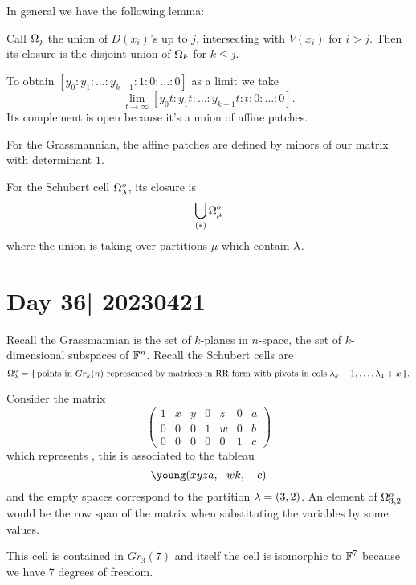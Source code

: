 \documentclass[12pt]{memoir}
\begin{document}
In general we have the following lemma:

\begin{Lem}
    Call $\Omega_j$ the union of $D(x_i)$'s up to $j$, intersecting with $V(x_i)$ for $i>j$. Then its closure is the disjoint union of $\Omega_k$ for $k\leq j$.
\end{Lem}

\begin{ptcbp}
    To obtain $[y_0:y_1:\dots:y_{k-1}:1:0:\dots:0]$ as a limit we take 
    $$\lim_{t\to\infty}[y_0t:y_1t:\dots:y_{k-1}t:t:0:\dots:0].$$
    Its complement is open because it's a union of affine patches.
\end{ptcbp}

For the Grassmannian, the affine patches are defined by minors of our matrix with determinant $1$.

\begin{Th}
    For the Schubert cell $\Omega_\lambda^o$, its closure is 
    $$\bigcup_{(\ast)}\Omega_\mu^o$$
    where the union is taking over partitions $\mu$ which contain $\lambda$.
\end{Th}

\section{Day 36| 20230421}

Recall the Grassmannian is the set of $k$-planes in $n$-space, the set of $k$-dimensional subspaces of $\mathbb{F}^n$. Recall the Schubert cells are 
$$\Omega_\lambda^o=\{\,\text{points in }Gr_k(n)\text{ represented by matrices in RR form with pivots in cols.}\lambda_k+1,\dots,\lambda_1+k\,\}.$$
\begin{Ex}
    Consider the matrix 
    $$\begin{pmatrix}
        1&x&y&0&z&0&a\\
        0&0&0&1&w&0&b\\
        0&0&0&0&0&1&c
    \end{pmatrix}$$
    which represents , this is associated to the tableau 
    $$\young(xyza,~~wk,~~~c)$$
    and the empty spaces correspond to the partition $\lambda=(3,2)$. An element of $\Omega_{3,2}^o$ would be the row span of the matrix when substituting the variables by some values.\par 
    This cell is contained in $Gr_3(7)$ and itself the cell is isomorphic to $\mathbb{F}^7$ because we have 7 degrees of freedom.
\end{Ex}
\end{document}
